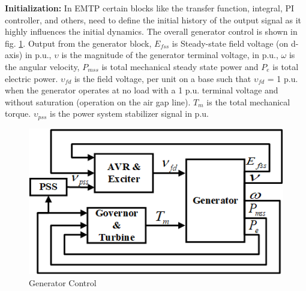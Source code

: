 \documentclass{report}
\begin{document}
\textbf{Initialization:}
In EMTP certain blocks like the transfer function, integral, PI controller, and others, need to define the initial history of the output signal as it highly influences the initial dynamics.
The overall generator control is shown in fig. \ref{fig:GControl}. Output from the generator block, $E_{fss}$ is Steady-state field voltage (on d-axis) in p.u., $\upsilon$ is the magnitude of the generator terminal voltage, in p.u., $\omega$ is the angular velocity, $P_{mss}$ is total mechanical steady state power and $P_e$ is total electric power. $\upsilon_{fd}$ is the field voltage, per unit on a base such that $\upsilon_{fd}$  = 1 p.u. when the generator operates at no load with a 1 p.u. terminal voltage and without saturation (operation on the air gap line). $T_m$ is the total mechanical torque. $\upsilon_{pss}$ is the power system stabilizer signal in p.u.
\begin{figure}[H]
    \centering
    \includegraphics[width=0.5\linewidth]{Figure_Nordic/GeneratorControl.png}
    \caption{Generator Control}
    \label{fig:GControl}
\end{figure}
\end{document}
